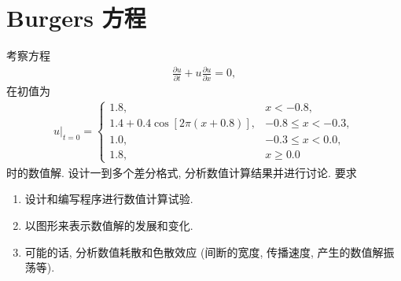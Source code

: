 \documentclass[10.5pt
]{article}
\begin{document}
\section{Burgers 方程}
考察方程
\begin{align}
\frac{\partial u}{\partial t} + u \frac{\partial u}{\partial x} = 0, \label{EqnBurgers}
\end{align}
在初值为
\begin{align}
u|_{t=0} = \left\{\begin{array}{ll} 1.8, & x < -0.8,
\\
1.4 + 0.4 \cos\left[2 \pi (x + 0.8) \right], & -0.8 \le x < -0.3,
\\
1.0, & -0.3 \le x < 0.0,
\\
1.8, & x \ge 0.0
\end{array} \right.
\end{align}
时的数值解. 设计一到多个差分格式, 分析数值计算结果并进行讨论. 要求
\begin{enumerate}
\item
  设计和编写程序进行数值计算试验.
\item
  以图形来表示数值解的发展和变化.
\item
  可能的话, 分析数值耗散和色散效应 (间断的宽度, 传播速度, 产生的数值解振荡等).
\end{enumerate}
\end{document}
